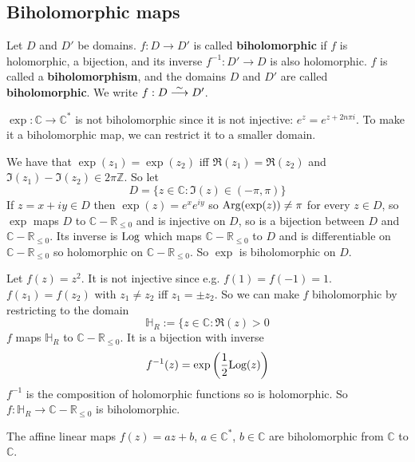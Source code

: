 \subsection{Biholomorphic maps}

\begin{definition}
	Let $D$ and $D'$ be domains. $f: D \to D'$ is called \textbf{biholomorphic} if $f$ is holomorphic, a bijection, and its inverse $f^{-1}: D' \to D$ is also holomorphic. $f$ is called a \textbf{biholomorphism}, and the domains $D$ and $D'$ are called \textbf{biholomorphic}. We write $f: D \mathrel{\overset{\sim}{\longrightarrow}} D'$.
\end{definition}

\begin{example}
	$\exp: \mathbb{C} \to \mathbb{C}^*$ is not biholomorphic since it is not injective: $e^z = e^{z + 2n \pi i}$. To make it a biholomorphic map, we can restrict it to a smaller domain.
	
	We have that $\exp(z_1) = \exp(z_2)$ iff $\Re(z_1) = \Re(z_2)$ and $\Im(z_1) - \Im(z_2) \in 2 \pi \mathbb{Z}$. So let
	\[
		D = \{ z \in \mathbb{C}: \Im(z) \in (-\pi, \pi) \}
	\]
	If $z = x + iy \in D$ then $\exp(z) = e^x e^{iy}$ so $\text{Arg}(\exp(z)) \ne \pi$ for every $z \in D$, so $\exp$ maps $D$ to $\mathbb{C} - \mathbb{R}_{\le 0}$ and is injective on $D$, so is a bijection between $D$ and $\mathbb{C} - \mathbb{R}_{\le 0}$. Its inverse is $\text{Log}$ which maps $\mathbb{C} - \mathbb{R}_{\le 0}$ to $D$ and is differentiable on $\mathbb{C} - \mathbb{R}_{\le 0}$ so holomorphic on $\mathbb{C} - \mathbb{R}_{\le 0}$. So $\exp$ is biholomorphic on $D$.
\end{example}

\begin{example}
	Let $f(z) = z^2$. It is not injective since e.g. $f(1) = f(-1) = 1$. $f(z_1) = f(z_2)$ with $z_1 \ne z_2$ iff $z_1 = \pm z_2$. So we can make $f$ biholomorphic by restricting to the domain
	\[
		\mathbb{H}_R := \{ z \in \mathbb{C}: \Re(z) > 0
	\]
	$f$ maps $\mathbb{H}_R$ to $\mathbb{C} - \mathbb{R}_{\le 0}$. It is a bijection with inverse
	\[
		f^{-1}(z) = \exp \left( \frac{1}{2} \text{Log}(z) \right)
	\]
	$f^{-1}$ is the composition of holomorphic functions so is holomorphic. So $f: \mathbb{H}_R \to \mathbb{C} - \mathbb{R}_{\le 0}$ is biholomorphic.
\end{example}

\begin{example}
	The affine linear maps $f(z) = az + b$, $a \in \mathbb{C}^*$, $b \in \mathbb{C}$ are biholomorphic from $\mathbb{C}$ to $\mathbb{C}$.
\end{example}

